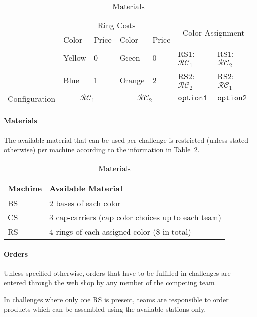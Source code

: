 \documentclass[12pt,twoside]{article}
\newcommand{\reftab}[1]{Table~\ref{#1}}
\begin{document}
\newcommand{\colconfig}{\mathcal{RC}}
\begin{table}[!htb]
 \centering
 \begin{tabular}{l|l|l||l|l||l|l}
  & \multicolumn{4}{c||}{Ring Costs}
  & \multicolumn{2}{c}{\multirow{2}{*}{Color Assignment }}\\\cline{2-5}
  & Color  & Price & Color  & Price & \multicolumn{2}{c}{}\\\cline{2-7}
  & Yellow & 0 & Green & 0
  & RS1: $\colconfig_1$ & RS1: $\colconfig_2$ \\
  & Blue  & 1 & Orange & 2
  & RS2: $\colconfig_2$ & RS2: $\colconfig_1$ \\\hline\hline
  Configuration & \multicolumn{2}{c||}{$\colconfig_1$}
  & \multicolumn{2}{c||}{$\colconfig_2$}
  & $\texttt{option1}$ & $\texttt{option2}$\\
 \end{tabular}
 \caption{Materials}
 \label{tab:ring-costs}
\end{table}

\paragraph{Materials}\label{sec:materials}
The available material that can be used per challenge is restricted
(unless stated otherwise) per machine according to the information in
\reftab{tab:materials}.
\begin{table}[!htb]
 \centering
  \begin{tabularx}{\linewidth}{l|l}
   Machine & Available Material  \\\hline
   \ac{BS} & 2 bases of each color \\
   \ac{CS} & 3 cap-carriers (cap color choices up to each team)  \\
   \ac{RS} & 4 rings of each assigned color (8 in total)  \\
  \end{tabularx}
 \caption{Materials}
 \label{tab:materials}
\end{table}

\paragraph{Orders}
Unless specified otherwise, orders that have to be fulfilled in challenges
are entered through the web shop  by any member of the
competing team.

In challenges where only one \ac{RS} is present, teams are responsible to
order products which can be assembled using the available stations only.
\end{document}
